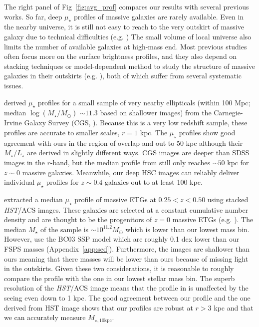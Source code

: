 \documentclass[a4paper,fleqn,usenatbib]{mnras}
\def\mstar{{$M_{\star}$}}
\def\logms{{$\log (M_{\star}/M_{\odot})$}}
\def\minn{{$M_{\star,10\mathrm{kpc}}$}}
\def\m2l{{$M_{\star}/L_{\star}$}}
\def\mden{{$\mu_{\star}$}}
\begin{document}
    The right panel of Fig~\ref{fig:avg_prof} compares our results with several 
    previous works. 
    So far, deep \mden{} profiles of massive galaxies are rarely available. 
    Even in the nearby universe, it is still not easy to reach to the very outskirt
    of massive galaxy due to technical difficulties (e.g. 
    \citealt{Capaccioli2015, Iodice2016, Iodice2017, Spavone2017, Mihos2017})
    The small volume of local universe also limits the number of available 
    galaxies at high-mass end.
    Most previous studies often focus more on the surface brightness profiles, 
    and they also depend on stacking techniques or model-dependent method to 
    study the structure of massive galaxies in their outskirts (e.g. 
    \citealt{Tal2011, DSouza2015}), both of which suffer from several systematic 
    issues. 
    
    \citet{Huang2013a} derived \mden{} profiles for a small sample of very nearby 
    ellipticals (within 100 Mpc; median \logms{} ${\sim} 11.3$ based on shallower 
    images) from the Carnegie-Irvine Galaxy Survey (CGS, \citealt{CGS1}). 
    Because this is a very low redshift sample, these profiles are accurate to 
    smaller scales, $r=1$ kpc. 
    The \citet{Huang2013a} \mden{} profiles show good agreement with ours in the 
    region of overlap and out to 50 kpc although their \m2l{} are derived in 
    slightly different ways.
    CGS images are deeper than SDSS images in the $r$-band, but the median 
    profile from \citet{Huang2013a} still only reaches ${\sim} 50$ kpc for $z{\sim} 0$ 
    massive galaxies.
    Meanwhile, our deep HSC images can reliably deliver individual \mden{} profiles 
    for $z{\sim} 0.4$ galaxies out to at least 100 kpc.  
    
    \citet{Patel2013} extracted a median \mden{} profile of massive ETGs at 
    $0.25 < z < 0.50$ using stacked \textit{HST}/ACS images. 
    These galaxies are selected at a constant cumulative number density and are 
    thought to be the progenitors of $z=0$ massive ETGs (e.g. \citealt{Leja2013}).  
    The median \mstar{} of the \citet{Patel2013} sample is 
    ${\sim} 10^{11.2} M_{\odot}$ which is lower than our lowest mass bin. 
    However, \citet{Patel2013} use the BC03 SSP model which are roughly 0.1 dex 
    lower than our FSPS masses (Appendix~\ref{app:sed}). 
    Furthermore, the \citet{Patel2013} images are shallower than ours meaning 
    that there masses will be lower than ours because of missing light in the 
    outskirts. 
    Given these two considerations, it is reasonable to roughly compare the 
    \citet{Patel2013} profile with the one in our lowest stellar mass bin. 
    The superb resolution of the \textit{HST}/ACS image means that the profile in
    \citet{Patel2013} is unaffected by the seeing even down to 1 kpc. 
    The good agreement between our profile and the one derived from HST image 
    shows that our profiles are robust at $r > 3$ kpc and that we can accurately 
    measure \minn{}.
    
\end{document}
